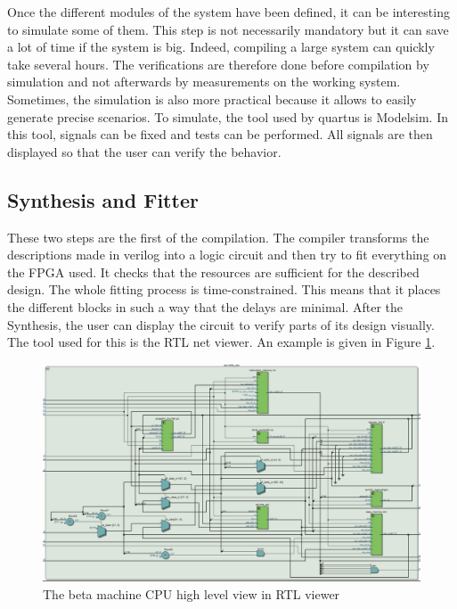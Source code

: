 Once the different modules of the system have been defined, it can be interesting to simulate some 
of them. This step is not necessarily mandatory but it can save a lot of time if the system is big. 
Indeed, compiling a large system can quickly take several hours. The verifications are therefore 
done before compilation by simulation and not afterwards by measurements on the working system. 
Sometimes, the simulation is also more practical because it allows to easily generate precise 
scenarios. To simulate, the tool used by quartus is Modelsim. In this tool, signals can be fixed 
and tests can be performed. All signals are then displayed so that the user can verify the 
behavior.

\subsection{Synthesis and Fitter}

These two steps are the first of the compilation. The compiler transforms the descriptions made
 in verilog into a logic circuit and then try to fit everything on the FPGA used. It checks that 
 the resources are sufficient for the described design. The whole fitting process is 
 time-constrained. This means that it places the different blocks in such a way that the delays 
 are minimal. After the Synthesis, the user can display the circuit to verify parts of its design
 visually. The tool used for this is the RTL net viewer. An example is given in Figure 
 \ref{fig:tools/rtl}.

 \begin{figure}[H]
    \centering
    \includegraphics[width=\linewidth]{Chapter2-FPGA_Flow/res/rtl.PNG}
    \caption{The beta machine CPU high level view in RTL viewer}
    \label{fig:tools/rtl}
\end{figure}

